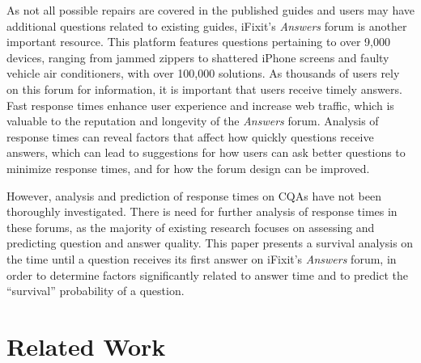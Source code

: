 \documentclass{article}
\begin{document}
As not all possible repairs are covered in the published guides and users may have additional questions related to existing guides, iFixit's \textit{Answers} forum is another important resource. This platform features questions pertaining to over 9,000 devices, ranging from jammed zippers to shattered iPhone screens and faulty vehicle air conditioners, with over 100,000 solutions. As thousands of users rely on this forum for information, it is important that users receive timely answers. Fast response times enhance user experience and increase web traffic, which is valuable to the reputation and longevity of the \textit{Answers} forum. Analysis of response times can reveal factors that affect how quickly questions receive answers, which can lead to suggestions for how users can ask better questions to minimize response times, and for how the forum design can be improved. 

However, analysis and prediction of response times on CQAs have not been thoroughly investigated. There is need for further analysis of response times in these forums, as the majority of existing research focuses on assessing and predicting question and answer quality. This paper presents a survival analysis on the time until a question receives its first answer on iFixit's \textit{Answers} forum, in order to determine factors significantly related to answer time and to predict the ``survival'' probability of a question.


\section*{Related Work}
  
\end{document}
